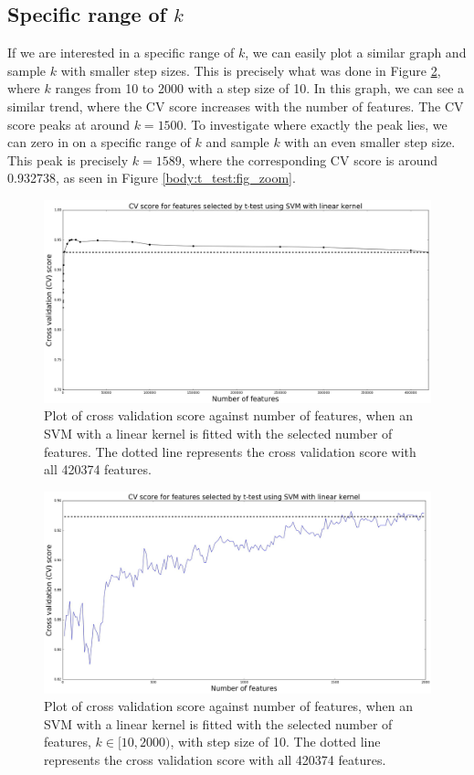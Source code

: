 \documentclass[12pt, twoside, a4paper]{report}
\begin{document}
\subsection{Specific range of $k$}
If we are interested in a specific range of $k$, we can easily plot a similar graph and sample $k$ with smaller step sizes. This is precisely what was done in Figure \ref{body:t_test:fig}, where $k$ ranges from 10 to 2000 with a step size of 10. In this graph, we can see a similar trend, where the CV score increases with the number of features. The CV score peaks at around $k=1500$. To investigate where exactly the peak lies, we can zero in on a specific range of $k$ and sample $k$ with an even smaller step size. This peak is precisely $k=1589$, where the corresponding CV score is around 0.932738, as seen in Figure \ref{body:t_test:fig_zoom}.




\begin{figure}
\centering
\includegraphics[width=\textwidth]{images/t_test_range.jpeg}
\caption{Plot of cross validation score against number of features, when an SVM with a linear kernel is fitted with the selected number of features. The dotted line represents the cross validation score with all 420374 features.}
\label{body:t_test:fig:range}
\end{figure}

\begin{figure}
\centering
\includegraphics[width=\textwidth]{images/t_test_2000_uneq_var1.jpeg}
\caption{Plot of cross validation score against number of features, when an SVM with a linear kernel is fitted with the selected number of features, $k \in [10, 2000)$, with step size of 10. The dotted line represents the cross validation score with all 420374 features.}
\label{body:t_test:fig}
\end{figure}
\end{document}
